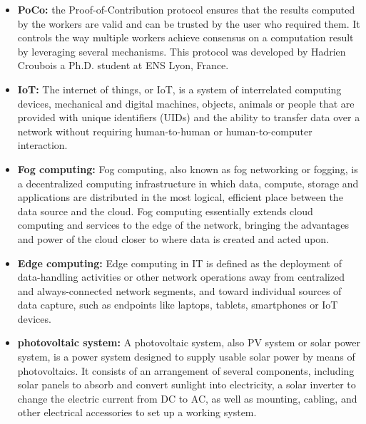 \begin{itemize}
        \item \textbf{PoCo:} the Proof-of-Contribution protocol\cite{POCO} ensures that the results computed by the
        workers are valid and can be trusted by the user who required them. It controls the way multiple
        workers achieve consensus on a computation result by leveraging several mechanisms\cite{poco-definition}.
        This protocol was developed by Hadrien Croubois\cite{hadrien-croubois} a Ph.D. student at ENS Lyon, France.

        \item \textbf{IoT:} The internet of things, or IoT, is a system of interrelated computing devices,
        mechanical and digital machines, objects, animals or people that are provided with unique identifiers
        (UIDs) and the ability to transfer data over a network without requiring human-to-human or
        human-to-computer interaction\cite{IoT}.

        \item \textbf{Fog computing:} Fog computing, also known as fog networking or fogging, is a decentralized
        computing infrastructure in which data, compute, storage and applications are distributed in the most
        logical, efficient place between the data source and the cloud. Fog computing essentially extends cloud
        computing and services to the edge of the network, bringing the advantages and power of the cloud closer
        to where data is created and acted upon\cite{fog-computing}.

        \item \textbf{Edge computing:} Edge computing in IT is defined as the deployment of data-handling
        activities or other network operations away from centralized and always-connected network segments, and
        toward individual sources of data capture, such as endpoints like laptops, tablets, smartphones or IoT
        devices\cite{edge-computing}.

        \item \textbf{photovoltaic system:} A photovoltaic system, also PV system or solar power system, is a
        power system designed to supply usable solar power by means of photovoltaics. It consists of an
        arrangement of several components, including solar panels to absorb and convert sunlight into
        electricity, a solar inverter to change the electric current from DC to AC, as well as mounting,
        cabling, and other electrical accessories to set up a working system.


\end{itemize}
